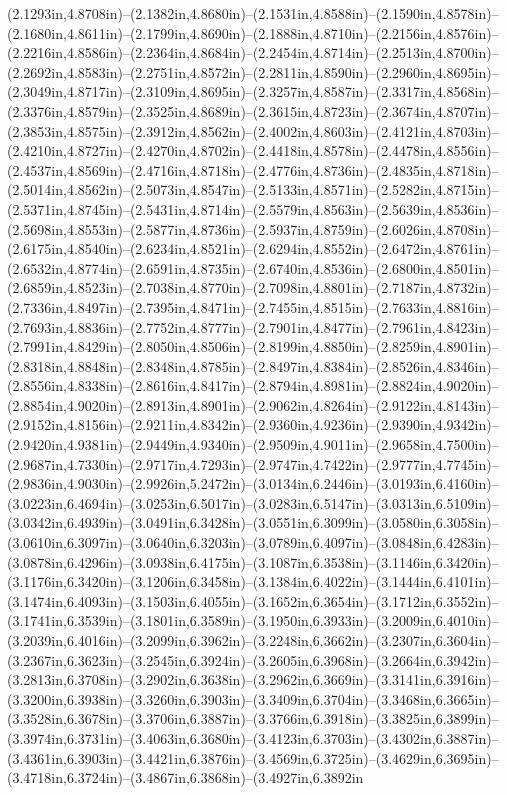 (2.1293in,4.8708in)--(2.1382in,4.8680in)--(2.1531in,4.8588in)--(2.1590in,4.8578in)--(2.1680in,4.8611in)--(2.1799in,4.8690in)--(2.1888in,4.8710in)--(2.2156in,4.8576in)--(2.2216in,4.8586in)--(2.2364in,4.8684in)--(2.2454in,4.8714in)--(2.2513in,4.8700in)--(2.2692in,4.8583in)--(2.2751in,4.8572in)--(2.2811in,4.8590in)--(2.2960in,4.8695in)--(2.3049in,4.8717in)--(2.3109in,4.8695in)--(2.3257in,4.8587in)--(2.3317in,4.8568in)--(2.3376in,4.8579in)--(2.3525in,4.8689in)--(2.3615in,4.8723in)--(2.3674in,4.8707in)--(2.3853in,4.8575in)--(2.3912in,4.8562in)--(2.4002in,4.8603in)--(2.4121in,4.8703in)--(2.4210in,4.8727in)--(2.4270in,4.8702in)--(2.4418in,4.8578in)--(2.4478in,4.8556in)--(2.4537in,4.8569in)--(2.4716in,4.8718in)--(2.4776in,4.8736in)--(2.4835in,4.8718in)--(2.5014in,4.8562in)--(2.5073in,4.8547in)--(2.5133in,4.8571in)--(2.5282in,4.8715in)--(2.5371in,4.8745in)--(2.5431in,4.8714in)--(2.5579in,4.8563in)--(2.5639in,4.8536in)--(2.5698in,4.8553in)--(2.5877in,4.8736in)--(2.5937in,4.8759in)--(2.6026in,4.8708in)--(2.6175in,4.8540in)--(2.6234in,4.8521in)--(2.6294in,4.8552in)--(2.6472in,4.8761in)--(2.6532in,4.8774in)--(2.6591in,4.8735in)--(2.6740in,4.8536in)--(2.6800in,4.8501in)--(2.6859in,4.8523in)--(2.7038in,4.8770in)--(2.7098in,4.8801in)--(2.7187in,4.8732in)--(2.7336in,4.8497in)--(2.7395in,4.8471in)--(2.7455in,4.8515in)--(2.7633in,4.8816in)--(2.7693in,4.8836in)--(2.7752in,4.8777in)--(2.7901in,4.8477in)--(2.7961in,4.8423in)--(2.7991in,4.8429in)--(2.8050in,4.8506in)--(2.8199in,4.8850in)--(2.8259in,4.8901in)--(2.8318in,4.8848in)--(2.8348in,4.8785in)--(2.8497in,4.8384in)--(2.8526in,4.8346in)--(2.8556in,4.8338in)--(2.8616in,4.8417in)--(2.8794in,4.8981in)--(2.8824in,4.9020in)--(2.8854in,4.9020in)--(2.8913in,4.8901in)--(2.9062in,4.8264in)--(2.9122in,4.8143in)--(2.9152in,4.8156in)--(2.9211in,4.8342in)--(2.9360in,4.9236in)--(2.9390in,4.9342in)--(2.9420in,4.9381in)--(2.9449in,4.9340in)--(2.9509in,4.9011in)--(2.9658in,4.7500in)--(2.9687in,4.7330in)--(2.9717in,4.7293in)--(2.9747in,4.7422in)--(2.9777in,4.7745in)--(2.9836in,4.9030in)--(2.9926in,5.2472in)--(3.0134in,6.2446in)--(3.0193in,6.4160in)--(3.0223in,6.4694in)--(3.0253in,6.5017in)--(3.0283in,6.5147in)--(3.0313in,6.5109in)--(3.0342in,6.4939in)--(3.0491in,6.3428in)--(3.0551in,6.3099in)--(3.0580in,6.3058in)--(3.0610in,6.3097in)--(3.0640in,6.3203in)--(3.0789in,6.4097in)--(3.0848in,6.4283in)--(3.0878in,6.4296in)--(3.0938in,6.4175in)--(3.1087in,6.3538in)--(3.1146in,6.3420in)--(3.1176in,6.3420in)--(3.1206in,6.3458in)--(3.1384in,6.4022in)--(3.1444in,6.4101in)--(3.1474in,6.4093in)--(3.1503in,6.4055in)--(3.1652in,6.3654in)--(3.1712in,6.3552in)--(3.1741in,6.3539in)--(3.1801in,6.3589in)--(3.1950in,6.3933in)--(3.2009in,6.4010in)--(3.2039in,6.4016in)--(3.2099in,6.3962in)--(3.2248in,6.3662in)--(3.2307in,6.3604in)--(3.2367in,6.3623in)--(3.2545in,6.3924in)--(3.2605in,6.3968in)--(3.2664in,6.3942in)--(3.2813in,6.3708in)--(3.2902in,6.3638in)--(3.2962in,6.3669in)--(3.3141in,6.3916in)--(3.3200in,6.3938in)--(3.3260in,6.3903in)--(3.3409in,6.3704in)--(3.3468in,6.3665in)--(3.3528in,6.3678in)--(3.3706in,6.3887in)--(3.3766in,6.3918in)--(3.3825in,6.3899in)--(3.3974in,6.3731in)--(3.4063in,6.3680in)--(3.4123in,6.3703in)--(3.4302in,6.3887in)--(3.4361in,6.3903in)--(3.4421in,6.3876in)--(3.4569in,6.3725in)--(3.4629in,6.3695in)--(3.4718in,6.3724in)--(3.4867in,6.3868in)--(3.4927in,6.3892in